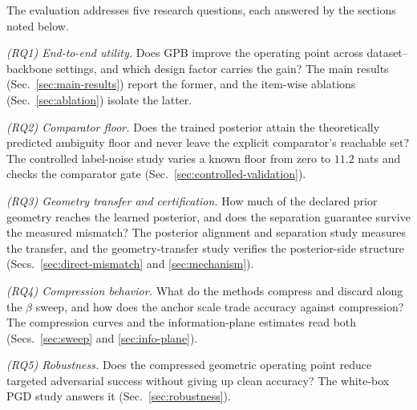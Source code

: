 The evaluation addresses five research questions, each answered by the sections
noted below.

\emph{(RQ1) End-to-end utility.} Does GPB improve the operating point across
dataset--backbone settings, and which design factor carries the gain? The main
results (Sec.~\ref{sec:main-results}) report the former, and the
item-wise ablations (Sec.~\ref{sec:ablation}) isolate the latter.

\emph{(RQ2) Comparator floor.} Does the trained posterior attain the theoretically
predicted ambiguity floor and never leave the explicit comparator's reachable set?
The controlled label-noise study varies a known floor from zero to $11.2$ nats and
checks the comparator gate (Sec.~\ref{sec:controlled-validation}).

\emph{(RQ3) Geometry transfer and certification.} How much of the declared prior
geometry reaches the learned posterior, and does the separation guarantee survive
the measured mismatch? The posterior alignment and separation study measures the transfer, and the
geometry-transfer study verifies the posterior-side structure (Secs.~\ref{sec:direct-mismatch}
and \ref{sec:mechanism}).

\emph{(RQ4) Compression behavior.} What do the methods compress and discard along
the $\beta$ sweep, and how does the anchor scale trade accuracy against
compression? The compression curves and the information-plane estimates read both
(Secs.~\ref{sec:sweep} and \ref{sec:info-plane}).

\emph{(RQ5) Robustness.} Does the compressed geometric operating point reduce
targeted adversarial success without giving up clean accuracy? The white-box PGD
study answers it (Sec.~\ref{sec:robustness}).

